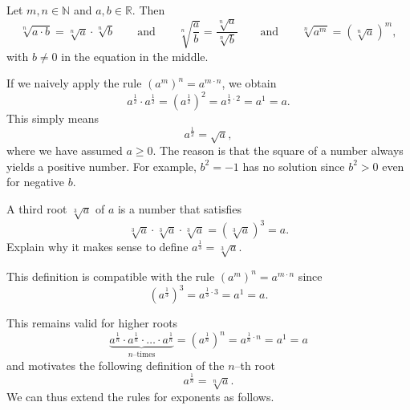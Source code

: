 \begin{tcolorbox}
	Let $m,n\in\mathbb N$ and $a,b\in\mathbb R$. Then
	\begin{equation*}
		\sqrt[n]{a\cdot b}=\sqrt[n]{a}\cdot\sqrt[n]{b}\qquad\text{and}\qquad
		\sqrt[n]{\frac{a}{b}}=\frac{\sqrt[n]{a}}{\sqrt[n]{b}}\qquad\text{and}\qquad
		\sqrt[n]{a^m}=\left(\sqrt[n]{a}\right)^m,
	\end{equation*}
	with $b\neq 0$ in the equation in the middle.
\end{tcolorbox}
\begin{example}
	If we naively apply the rule $(a^m)^n=a^{m\cdot n}$, we obtain
	\begin{equation*}
		a^{\frac{1}{2}}\cdot a^{\frac{1}{2}}
		=\left(a^{\frac{1}{2}}\right)^2
		=a^{\frac{1}{2}\cdot 2}=a^1=a.
	\end{equation*}
	This simply means
	\begin{equation*}
		a^{\frac{1}{2}}=\sqrt{a},
	\end{equation*}
	where we have assumed $a\geq0$.
	The reason is that the square of a number always yields a positive number.
	For example, $b^2=-1$ has no solution since $b^2>0$ even for negative $b$.
\end{example}
\begin{exercise}
	A third root $\sqrt[3]{a}$ of $a$ is a number that satisfies
	\begin{equation*}
		\sqrt[3]{a}\cdot\sqrt[3]{a}\cdot\sqrt[3]{a}=\left(\sqrt[3]{a}\right)^3=a.
	\end{equation*}
	Explain why it makes sense to define $a^{\frac{1}{3}}=\sqrt[3]{a}$.
\end{exercise}
\begin{solution*}
	This definition is compatible with the rule $(a^m)^n=a^{m\cdot n}$ since
	\begin{equation*}
		\left(a^{\frac{1}{3}}\right)^3=a^{\frac{1}{3}\cdot 3}=a^1=a.
	\end{equation*}
\end{solution*}
This remains valid for higher roots
\begin{equation*}
	\underbrace{a^{\frac{1}{n}}\cdot a^{\frac{1}{n}}\cdot\ldots\cdot a^{\frac{1}{n}}}_{n\text{--times}}
	=\left(a^{\frac{1}{n}}\right)^n=a^{\frac{1}{n}\cdot n}=a^1=a
\end{equation*}
and motivates the following definition of the $n$--th root
\begin{equation*}
	a^{\frac{1}{n}}=\sqrt[n]{a}.
\end{equation*}
We can thus extend the rules for exponents as follows.
